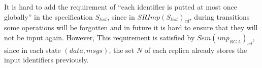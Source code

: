 It is hard to add the requirement of ``each identifier is putted at most once globally'' in the specification $S_{\mathit{list}}$, since in $\mathit{SRImp}(S_{\mathit{list}})_{\mathit{cd}}$, during transitions some operations will be forgotten and in future it is hard to ensure that they will not be input again. However, This requirement is satisfied by $\mathit{Sem}( \mathit{imp}_{\mathit{RGA}})_{\mathit{cd}}$, since in each state $(\mathit{data},\mathit{msgs})$, the set $N$ of each replica already stores the input identifiers previously.  




















































